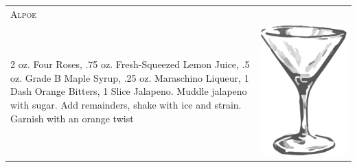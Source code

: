 \documentclass{article}
\begin{document}
\begin{multicols}{2}
\begin{tabular}{p{2in} p{0.5in}}
 \multicolumn{2}{p{3in}}{\centering\Huge\textsc{Alpoe}} \\ 
    \vspace{-0.1in}2 oz. Four Roses, .75 oz. Fresh-Squeezed Lemon Juice, .5 oz. Grade B Maple Syrup, .25 oz.  Maraschino Liqueur, 1 Dash Orange Bitters, 1 Slice Jalapeno. Muddle jalapeno with sugar. Add remainders, shake with ice and strain. Garnish with an orange twist &
   \vspace{-0.1in} \includegraphics{goblet.png}
\end{tabular}


\end{multicols}
\end{document}
